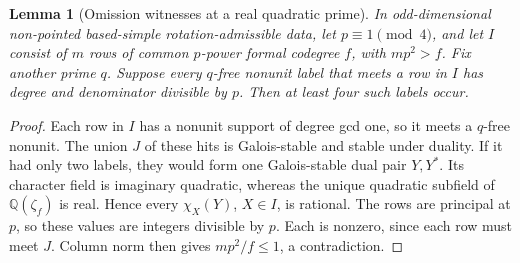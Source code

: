 \documentclass[11pt]{amsart}
\numberwithin{equation}{section}
\newtheorem{lemma}[theorem]{Lemma}
\theoremstyle{definition}
\theoremstyle{plain}
\begin{document}
\begin{lemma}[Omission witnesses at a real quadratic prime]\label{odd:omission-four}
In odd-dimensional non-pointed based-simple rotation-admissible data,
let $p\equiv1\pmod4$, and let $I$ consist of $m$ rows of common
$p$-power formal codegree $f$, with $mp^2>f$. Fix another prime $q$.
Suppose every $q$-free nonunit label that meets a row in $I$ has degree
and denominator divisible by $p$. Then at least four such labels occur.
\end{lemma}
\begin{proof}
Each row in $I$ has a nonunit support of degree gcd one, so it meets
a $q$-free nonunit. The union $J$ of these hits is Galois-stable and
stable under duality. If it had only two labels, they would form one
Galois-stable dual pair $Y,Y^*$. Its character field is imaginary
quadratic, whereas the unique quadratic subfield of
$\mathbb Q(\zeta_f)$ is real. Hence every $\chi_X(Y)$, $X\in I$,
is rational. The rows are principal at $p$, so these values are
integers divisible by $p$. Each is nonzero, since each row must meet
$J$. Column norm then gives $mp^2/f\le1$, a contradiction.
\end{proof}
\end{document}
